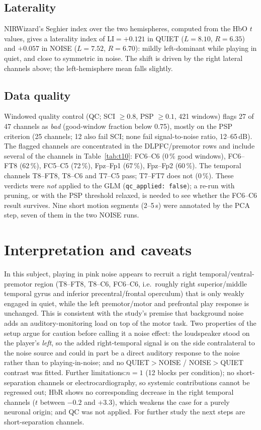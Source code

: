 \documentclass[11pt,a4paper]{article}
\begin{document}
\subsection{Laterality}
NIRWizard's Seghier index over the two hemispheres, computed from the HbO $t$
values, gives a laterality index of $\mathrm{LI}=+0.121$ in QUIET ($L=8.10$,
$R=6.35$) and $+0.057$ in NOISE ($L=7.52$, $R=6.70$): mildly left-dominant
while playing in quiet, and close to symmetric in noise. The shift is driven
by the right lateral channels above; the left-hemisphere mean falls slightly.

\subsection{Data quality}
\label{sec:qc}
Windowed quality control (QC; SCI $\ge0.8$, PSP $\ge0.1$, 421 windows) flags
27 of 47 channels as
\emph{bad} (good-window fraction below 0.75), mostly on the PSP criterion (25
channels; 12 also fail SCI; none fail signal-to-noise ratio, 12--65\,dB). The
flagged channels are concentrated in the DLPFC/premotor rows and include
several of the channels in Table~\ref{tab:t10}: FC6--C6 (0\,\% good windows),
FC6--FT8 (62\,\%), FC5--C5 (72\,\%), Fpz--Fp1 (67\,\%), Fpz--Fp2 (60\,\%). The
temporal channels T8--FT8, T8--C6 and T7--C5 pass; T7--FT7 does not (0\,\%).
These verdicts were \emph{not} applied to the GLM (\texttt{qc\_applied:
false}); a re-run with pruning, or with the PSP threshold relaxed, is needed
to see whether the FC6--C6 result survives. Nine short motion segments
(2--5\,s) were annotated by the PCA step, seven of them in the two NOISE runs.

\section{Interpretation and caveats}
In this subject, playing in pink noise appears to recruit
a right temporal/ventral-premotor region (T8--FT8, T8--C6, FC6--C6, i.e.\
roughly right superior/middle temporal gyrus and inferior precentral/frontal
operculum) that is only weakly engaged in quiet, while the left premotor/motor
and prefrontal play response is unchanged. This is consistent with the study's
premise that background noise adds an auditory-monitoring load on top of the
motor task. Two properties of the setup argue for caution before calling it a
noise effect: the loudspeaker stood on the player's \emph{left}, so the added
right-temporal signal is on the side contralateral to the noise source and
could in part be a direct auditory response to the noise rather than to
playing-in-noise; and no QUIET$>$NOISE / NOISE$>$QUIET contrast was fitted. 
Further limitations:$n=1$ (12 blocks per condition); no short-separation channels or
electrocardiography, so systemic contributions cannot be regressed out; HbR
shows no corresponding decrease in the right temporal channels ($t$ between
$-0.2$ and $+3.3$), which weakens the case for a purely neuronal origin; and
QC was not applied. For further study the next steps are short-separation channels.
\end{document}

